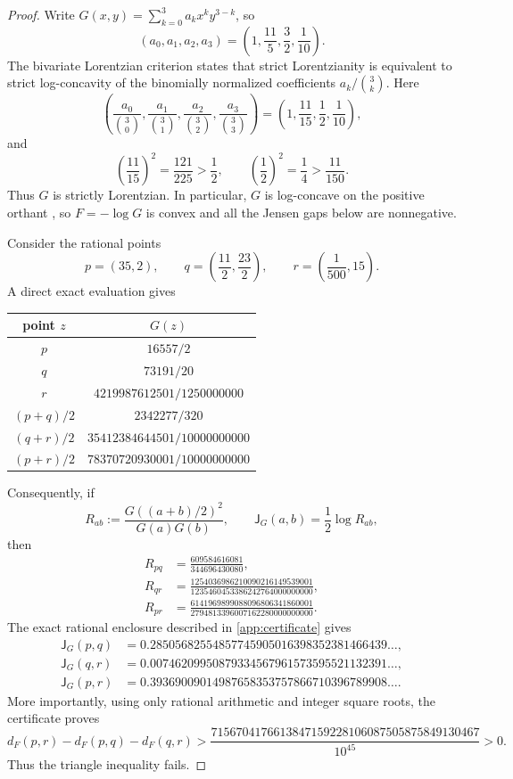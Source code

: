 \documentclass[11pt]{article}
\theoremstyle{definition}
\newcommand{\J}{\mathsf{J}}
\begin{document}
\begin{proof}
Write $G(x,y)=\sum_{k=0}^3 a_kx^ky^{3-k}$, so
\[
 (a_0,a_1,a_2,a_3)=\left(1,\frac{11}{5},\frac32,\frac1{10}\right).
\]
The bivariate Lorentzian criterion \cite[Example~2.3]{BrandenHuh} states that strict Lorentzianity is equivalent to strict
log-concavity of the binomially normalized coefficients $a_k/\binom3k$.  Here
\[
 \left(\frac{a_0}{\binom30},\frac{a_1}{\binom31},
       \frac{a_2}{\binom32},\frac{a_3}{\binom33}\right)
 =\left(1,\frac{11}{15},\frac12,\frac1{10}\right),
\]
and
\[
 \left(\frac{11}{15}\right)^2=\frac{121}{225}>\frac12,
 \qquad
 \left(\frac12\right)^2=\frac14>\frac{11}{150}.
\]
Thus $G$ is strictly Lorentzian.  In particular, $G$ is log-concave on the positive
orthant \cite{BrandenHuh}, so $F=-\log G$ is convex and all the Jensen gaps below are
nonnegative.

Consider the rational points
\begin{equation}\label{eq:points}
 p=(35,2),
 \qquad
 q=\left(\frac{11}{2},\frac{23}{2}\right),
 \qquad
 r=\left(\frac1{500},15\right).
\end{equation}
A direct exact evaluation gives
\begin{center}
\begin{tabular}{@{}c@{\qquad}c@{}}
\toprule
point $z$ & $G(z)$\\
\midrule
$p$ & $16557/2$\\
$q$ & $73191/20$\\
$r$ & $4219987612501/1250000000$\\
$(p+q)/2$ & $2342277/320$\\
$(q+r)/2$ & $35412384644501/10000000000$\\
$(p+r)/2$ & $78370720930001/10000000000$\\
\bottomrule
\end{tabular}
\end{center}
Consequently, if
\[
 R_{ab}:=\frac{G((a+b)/2)^2}{G(a)G(b)},
 \qquad
 \J_G(a,b)=\frac12\log R_{ab},
\]
then
\begin{align*}
 R_{pq}&=\frac{609584616081}{344696430080},\\
 R_{qr}&=\frac{1254036986210090216149539001}
               {1235460453386242764000000000},\\
 R_{pr}&=\frac{6141969899088096806341860001}
               {2794813396007162280000000000}.
\end{align*}
The exact rational enclosure described in \cref{app:certificate} gives
\begin{align*}
 \J_G(p,q)&=0.28505682554857745905016398352381466439\ldots,\\
 \J_G(q,r)&=0.00746209950879334567961573595521132391\ldots,\\
 \J_G(p,r)&=0.39369009014987658353757866710396789908\ldots.
\end{align*}
More importantly, using only rational arithmetic and integer square roots, the certificate proves
\begin{equation}\label{eq:exact-violation-lower-bound}
 d_F(p,r)-d_F(p,q)-d_F(q,r)
 >\frac{7156704176613847159228106087505875849130467}{10^{45}}>0.
\end{equation}
Thus the triangle inequality fails.
\end{proof}
\end{document}
